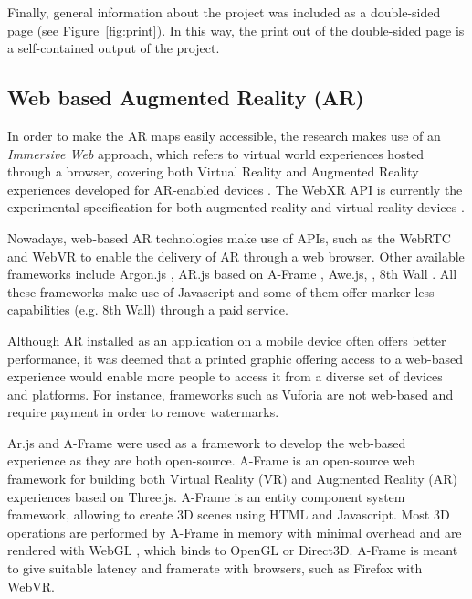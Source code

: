 \documentclass[acmlarge,screen,dvipsnames]{acmart}
\begin{document}
Finally, general information about the project was included as a
double-sided page (see Figure~\ref{fig:print}). In this way, the print out of the double-sided
page is a self-contained output of the project.





\subsection{Web based Augmented Reality (AR)} %

In order to make the AR maps easily
accessible, the research makes use of an \emph{Immersive Web} approach, which
refers to virtual world experiences hosted through a browser, covering both
Virtual Reality and Augmented Reality experiences developed for AR-enabled
devices \cite{imweb}. The WebXR API is currently the experimental
specification for both augmented reality and virtual reality devices
\cite{webxr}.

Nowadays, web-based AR technologies make use of APIs, such as the WebRTC and WebVR
to enable the delivery of AR through a web browser. Other available frameworks include Argon.js \cite{Argon.js}, AR.js based on A-Frame
\cite{aframe}, Awe.js, \cite{Awe.js}, 8th Wall \cite{8th}. All these
frameworks make use of Javascript and some of them offer marker-less
capabilities (e.g. 8th Wall) through a paid service.

Although AR installed as an application on a mobile device often offers better
performance, it was deemed that a printed graphic offering access to a web-based experience would enable more people
to access it from a diverse set of devices and platforms. For
instance, frameworks such as Vuforia \cite{Vuforia} are not web-based and
require payment in order to remove watermarks. 

Ar.js and A-Frame were used as a framework to develop the web-based experience
as they are both open-source. A-Frame is an open-source web framework for
building both Virtual Reality (VR) and Augmented Reality (AR) experiences
based on Three.js. A-Frame is an entity component system framework, allowing to create 3D scenes using HTML and Javascript. Most 3D operations are
performed by A-Frame in memory with minimal overhead and are rendered with
WebGL \cite{webgl}, which binds to OpenGL or Direct3D. A-Frame is meant to
give suitable latency and framerate with browsers, such as Firefox with WebVR.
\end{document}
